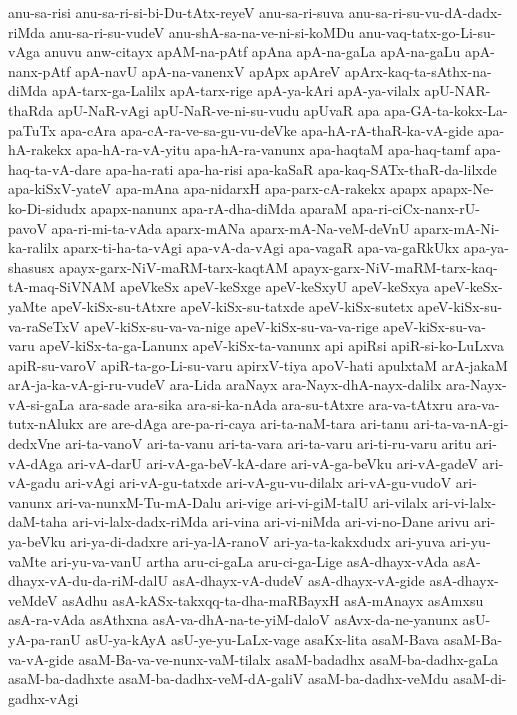 {anu-sa-risi
anu-sa-ri-si-bi-Du-tAtx-reyeV
anu-sa-ri-suva
anu-sa-ri-su-vu-dA-dadx-riMda
anu-sa-ri-su-vudeV
anu-shA-sa-na-ve-ni-si-koMDu
anu-vaq-tatx-go-Li-su-vAga
anuvu
anw-citayx
apAM-na-pAtf
apAna
apA-na-gaLa
apA-na-gaLu
apA-nanx-pAtf
apA-navU
apA-na-vanenxV
apApx
apAreV
apArx-kaq-ta-sAthx-na-diMda
apA-tarx-ga-Lalilx
apA-tarx-rige
apA-ya-kAri
apA-ya-vilalx
apU-NAR-thaRda
apU-NaR-vAgi
apU-NaR-ve-ni-su-vudu
apUvaR
apa
apa-GA-ta-kokx-La-paTuTx
apa-cAra
apa-cA-ra-ve-sa-gu-vu-deVke
apa-hA-rA-thaR-ka-vA-gide
apa-hA-rakekx
apa-hA-ra-vA-yitu
apa-hA-ra-vanunx
apa-haqtaM
apa-haq-tamf
apa-haq-ta-vA-dare
apa-ha-rati
apa-ha-risi
apa-kaSaR
apa-kaq-SATx-thaR-da-lilxde
apa-kiSxV-yateV
apa-mAna
apa-nidarxH
apa-parx-cA-rakekx
apapx
apapx-Ne-ko-Di-sidudx
apapx-nanunx
apa-rA-dha-diMda
aparaM
apa-ri-ciCx-nanx-rU-pavoV
apa-ri-mi-ta-vAda
aparx-mANa
aparx-mA-Na-veM-deVnU
aparx-mA-Ni-ka-ralilx
aparx-ti-ha-ta-vAgi
apa-vA-da-vAgi
apa-vagaR
apa-va-gaRkUkx
apa-ya-shasusx
apayx-garx-NiV-maRM-tarx-kaqtAM
apayx-garx-NiV-maRM-tarx-kaq-tA-maq-SiVNAM
apeVkeSx
apeV-keSxge
apeV-keSxyU
apeV-keSxya
apeV-keSx-yaMte
apeV-kiSx-su-tAtxre
apeV-kiSx-su-tatxde
apeV-kiSx-sutetx
apeV-kiSx-su-va-raSeTxV
apeV-kiSx-su-va-va-nige
apeV-kiSx-su-va-va-rige
apeV-kiSx-su-va-varu
apeV-kiSx-ta-ga-Lanunx
apeV-kiSx-ta-vanunx
api
apiRsi
apiR-si-ko-LuLxva
apiR-su-varoV
apiR-ta-go-Li-su-varu
apirxV-tiya
apoV-hati
apulxtaM
arA-jakaM
arA-ja-ka-vA-gi-ru-vudeV
ara-Lida
araNayx
ara-Nayx-dhA-nayx-dalilx
ara-Nayx-vA-si-gaLa
ara-sade
ara-sika
ara-si-ka-nAda
ara-su-tAtxre
ara-va-tAtxru
ara-va-tutx-nAlukx
are
are-dAga
are-pa-ri-caya
ari-ta-naM-tara
ari-tanu
ari-ta-va-nA-gi-dedxVne
ari-ta-vanoV
ari-ta-vanu
ari-ta-vara
ari-ta-varu
ari-ti-ru-varu
aritu
ari-vA-dAga
ari-vA-darU
ari-vA-ga-beV-kA-dare
ari-vA-ga-beVku
ari-vA-gadeV
ari-vA-gadu
ari-vAgi
ari-vA-gu-tatxde
ari-vA-gu-vu-dilalx
ari-vA-gu-vudoV
ari-vanunx
ari-va-nunxM-Tu-mA-Dalu
ari-vige
ari-vi-giM-talU
ari-vilalx
ari-vi-lalx-daM-taha
ari-vi-lalx-dadx-riMda
ari-vina
ari-vi-niMda
ari-vi-no-Dane
arivu
ari-ya-beVku
ari-ya-di-dadxre
ari-ya-lA-ranoV
ari-ya-ta-kakxdudx
ari-yuva
ari-yu-vaMte
ari-yu-va-vanU
artha
aru-ci-gaLa
aru-ci-ga-Lige
asA-dhayx-vAda
asA-dhayx-vA-du-da-riM-dalU
asA-dhayx-vA-dudeV
asA-dhayx-vA-gide
asA-dhayx-veMdeV
asAdhu
asA-kASx-takxqq-ta-dha-maRBayxH
asA-mAnayx
asAmxsu
asA-ra-vAda
asAthxna
asA-va-dhA-na-te-yiM-daloV
asAvx-da-ne-yanunx
asU-yA-pa-ranU
asU-ya-kAyA
asU-ye-yu-LaLx-vage
asaKx-lita
asaM-Bava
asaM-Ba-va-vA-gide
asaM-Ba-va-ve-nunx-vaM-tilalx
asaM-badadhx
asaM-ba-dadhx-gaLa
asaM-ba-dadhxte
asaM-ba-dadhx-veM-dA-galiV
asaM-ba-dadhx-veMdu
asaM-di-gadhx-vAgi
}

